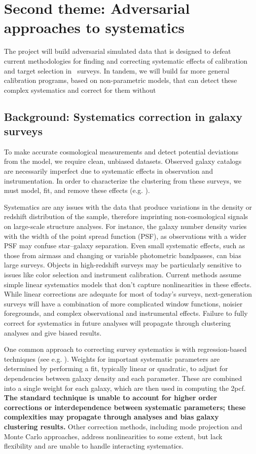 \documentclass[12pt, fullpage, letterpaper]{article}
\newcommand{\cf}{2pcf\xspace}
\begin{document}
\section{Second theme: Adversarial approaches to systematics}

The project will build adversarial simulated data that is
designed to defeat current methodologies for finding and correcting
systematic effects of calibration and target selection in \LSS\ 
surveys. 
In tandem, we will build far more general calibration
programs, based on non-parametric models, that can detect these complex systematics and correct for them without

\subsection{Background: Systematics correction in galaxy surveys}

To make accurate cosmological measurements and detect potential deviations from the model, we require clean, unbiased datasets.
Observed galaxy catalogs are necessarily imperfect due to systematic effects in observation and instrumentation. 
In order to characterize the clustering from these surveys, we must model, fit, and remove these effects (e.g. \citealt{Agarwal2014}).

Systematics are any issues with the data that produce variations in the density or redshift distribution of the sample, therefore imprinting non-cosmological signals on large-scale structure analyses.
For instance, the galaxy number density varies with the width of the point spread function (PSF), as observations with a wider PSF may confuse star--galaxy separation.
Even small systematic effects, such as those from airmass and changing or variable photometric bandpasses, can bias large surveys. 
Objects in high-redshift surveys may be particularly sensitive to issues like color selection and instrument calibration.
Current methods assume simple linear systematics models that don't capture nonlinearities in these effects.
While linear corrections are adequate for most of today's surveys, next-generation surveys will have a combination of more complicated window functions, noisier foregrounds, and complex observational and instrumental effects.
Failure to fully correct for systematics in future analyses will propagate through clustering analyses and give biased results.

One common approach to correcting survey systematics is with regression-based techniques (see e.g. \citealt{Ross2010}).
Weights for important systematic parameters are determined by performing a fit, typically linear or quadratic, to adjust for dependencies between galaxy density and each parameter.
These are combined into a single weight for each galaxy, which are then used in computing the \cf.
\textbf{The standard technique is unable to account for higher order corrections or interdependence between systematic parameters; these complexities may propagate through analyses and bias galaxy clustering results.}
Other correction methods, including mode projection and Monte Carlo approaches, address nonlinearities to some extent, but lack flexibility and are unable to handle interacting systematics.
\end{document}
